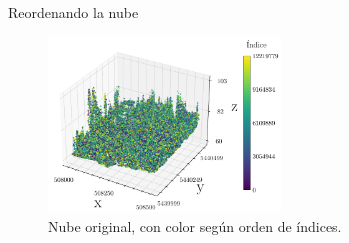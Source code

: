 \documentclass[aspectratio=169]{beamer}
\begin{document}
\begin{frame}{Reordenando la nube}
    \begin{figure}
        \centering
        \includegraphics[width=0.55\textwidth]{img/plot_5080-54400_unencoded.pdf}
        \caption{Nube original, con color según orden de índices.}
    \end{figure}
\end{frame}
\end{document}

